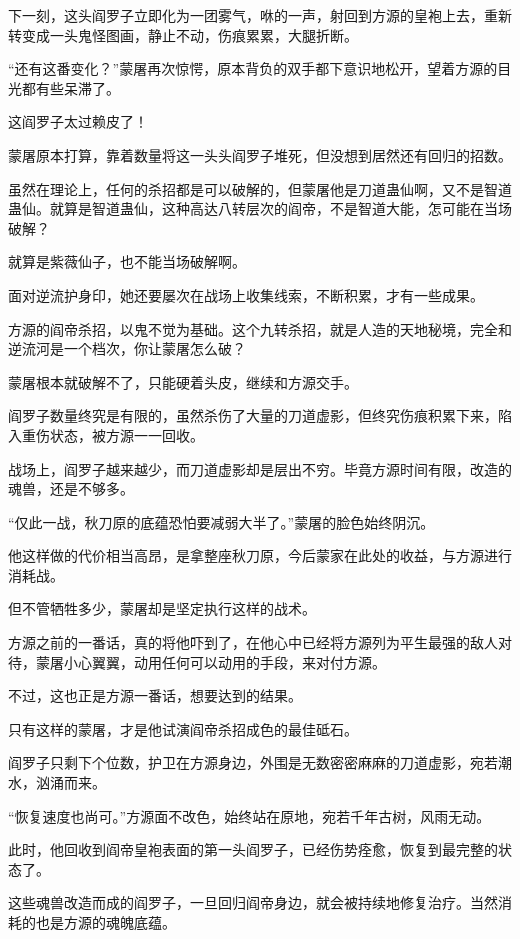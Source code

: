 \begin{this_body}
下一刻，这头阎罗子立即化为一团雾气，咻的一声，射回到方源的皇袍上去，重新转变成一头鬼怪图画，静止不动，伤痕累累，大腿折断。

“还有这番变化？”蒙屠再次惊愕，原本背负的双手都下意识地松开，望着方源的目光都有些呆滞了。

这阎罗子太过赖皮了！

蒙屠原本打算，靠着数量将这一头头阎罗子堆死，但没想到居然还有回归的招数。

虽然在理论上，任何的杀招都是可以破解的，但蒙屠他是刀道蛊仙啊，又不是智道蛊仙。就算是智道蛊仙，这种高达八转层次的阎帝，不是智道大能，怎可能在当场破解？

就算是紫薇仙子，也不能当场破解啊。

面对逆流护身印，她还要屡次在战场上收集线索，不断积累，才有一些成果。

方源的阎帝杀招，以鬼不觉为基础。这个九转杀招，就是人造的天地秘境，完全和逆流河是一个档次，你让蒙屠怎么破？

蒙屠根本就破解不了，只能硬着头皮，继续和方源交手。

阎罗子数量终究是有限的，虽然杀伤了大量的刀道虚影，但终究伤痕积累下来，陷入重伤状态，被方源一一回收。

战场上，阎罗子越来越少，而刀道虚影却是层出不穷。毕竟方源时间有限，改造的魂兽，还是不够多。

“仅此一战，秋刀原的底蕴恐怕要减弱大半了。”蒙屠的脸色始终阴沉。

他这样做的代价相当高昂，是拿整座秋刀原，今后蒙家在此处的收益，与方源进行消耗战。

但不管牺牲多少，蒙屠却是坚定执行这样的战术。

方源之前的一番话，真的将他吓到了，在他心中已经将方源列为平生最强的敌人对待，蒙屠小心翼翼，动用任何可以动用的手段，来对付方源。

不过，这也正是方源一番话，想要达到的结果。

只有这样的蒙屠，才是他试演阎帝杀招成色的最佳砥石。

阎罗子只剩下个位数，护卫在方源身边，外围是无数密密麻麻的刀道虚影，宛若潮水，汹涌而来。

“恢复速度也尚可。”方源面不改色，始终站在原地，宛若千年古树，风雨无动。

此时，他回收到阎帝皇袍表面的第一头阎罗子，已经伤势痊愈，恢复到最完整的状态了。

这些魂兽改造而成的阎罗子，一旦回归阎帝身边，就会被持续地修复治疗。当然消耗的也是方源的魂魄底蕴。


\end{this_body}
